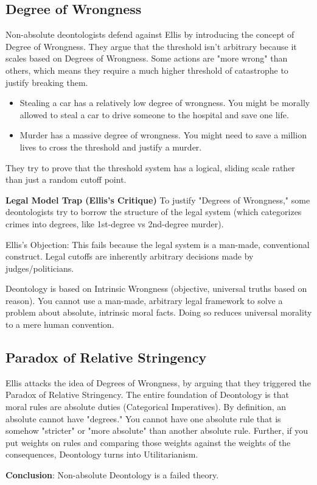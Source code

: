 \documentclass[12pt]{article}
\begin{document}
\subsection{Degree of Wrongness}
Non-absolute deontologists defend against Ellis by introducing the concept of Degree of Wrongness.
They argue that the threshold isn't arbitrary because it scales based on Degrees of Wrongness. Some actions are "more wrong" than others, which means they require a much higher threshold of catastrophe to justify breaking them.
\begin{itemize}
    \item Stealing a car has a relatively low degree of wrongness. You might be morally allowed to steal a car to drive someone to the hospital and save one life.
    \item Murder has a massive degree of wrongness. You might need to save a million lives to cross the threshold and justify a murder.
\end{itemize}
They try to prove that the threshold system has a logical, sliding scale rather than just a random cutoff point.

\vspace{1em}
\noindent\textbf{Legal Model Trap (Ellis's Critique)}
To justify "Degrees of Wrongness," some deontologists try to borrow the structure of the legal system (which categorizes crimes into degrees, like 1st-degree vs 2nd-degree murder).

\noindent Ellis's Objection: This fails because the legal system is a man-made, conventional construct. Legal cutoffs are inherently arbitrary decisions made by judges/politicians.

\noindent Deontology is based on Intrinsic Wrongness (objective, universal truths based on reason). You cannot use a man-made, arbitrary legal framework to solve a problem about absolute, intrinsic moral facts.
Doing so reduces universal morality to a mere human convention.

\subsection{Paradox of Relative Stringency}
Ellis attacks the idea of Degrees of Wrongness, by arguing that they triggered the Paradox of Relative Stringency.
The entire foundation of Deontology is that moral rules are absolute duties (Categorical Imperatives).
By definition, an absolute cannot have "degrees." You cannot have one absolute rule that is somehow "stricter" or "more absolute" than another absolute rule.
Further, if you put weights on rules and comparing those weights against the weights of the consequences, Deontology turns into Utilitarianism.

\noindent\textbf{Conclusion}: Non-absolute Deontology is a failed theory.
\end{document}
